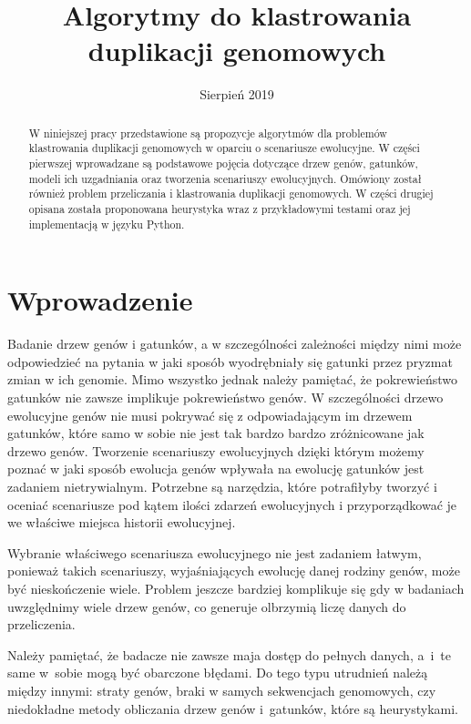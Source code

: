\documentclass[licencjacka]{pracamgr}
\title{Algorytmy do klastrowania duplikacji genomowych}
\date{Sierpień 2019}
\begin{document}
\maketitle


\begin{abstract}
   W niniejszej pracy przedstawione są propozycje algorytmów dla problemów klastrowania duplikacji genomowych w oparciu o scenariusze ewolucyjne. W części pierwszej wprowadzane są podstawowe pojęcia dotyczące drzew genów, gatunków, modeli ich uzgadniania oraz tworzenia scenariuszy ewolucyjnych. Omówiony został również problem przeliczania i klastrowania duplikacji genomowych. W części drugiej opisana została proponowana heurystyka wraz z przykładowymi testami oraz jej implementacją w języku Python.
\end{abstract}


\renewcommand{\contentsname}{Spis Treści}
\tableofcontents

\chapter*{Wprowadzenie}


Badanie drzew genów i gatunków, a w szczególności zależności między nimi może odpowiedzieć na pytania w jaki sposób wyodrębniały się gatunki przez pryzmat zmian w ich genomie. Mimo wszystko jednak należy pamiętać, że pokrewieństwo gatunków nie zawsze implikuje pokrewieństwo genów. W szczególności drzewo ewolucyjne genów nie musi pokrywać się z odpowiadającym im drzewem gatunków, które samo w sobie nie jest tak bardzo bardzo zróżnicowane jak drzewo genów. Tworzenie scenariuszy ewolucyjnych dzięki którym możemy poznać w jaki sposób ewolucja genów wpływała na ewolucję gatunków jest zadaniem nietrywialnym. Potrzebne są narzędzia, które potrafiłyby tworzyć i oceniać scenariusze pod kątem ilości zdarzeń ewolucyjnych i przyporządkować je we właściwe miejsca historii ewolucyjnej.

Wybranie właściwego scenariusza ewolucyjnego nie jest zadaniem łatwym, ponieważ takich scenariuszy, wyjaśniających ewolucję danej rodziny genów, może być nieskończenie wiele. Problem jeszcze bardziej komplikuje się gdy w badaniach uwzględnimy wiele drzew genów, co generuje olbrzymią liczę danych do przeliczenia.

Należy pamiętać, że badacze nie zawsze maja dostęp do pełnych danych, a~i~te same w~sobie mogą być obarczone błędami. Do tego typu utrudnień należą między innymi: straty genów, braki w samych sekwencjach genomowych, czy niedokładne metody obliczania drzew genów i~gatunków, które są heurystykami. 
\end{document}
